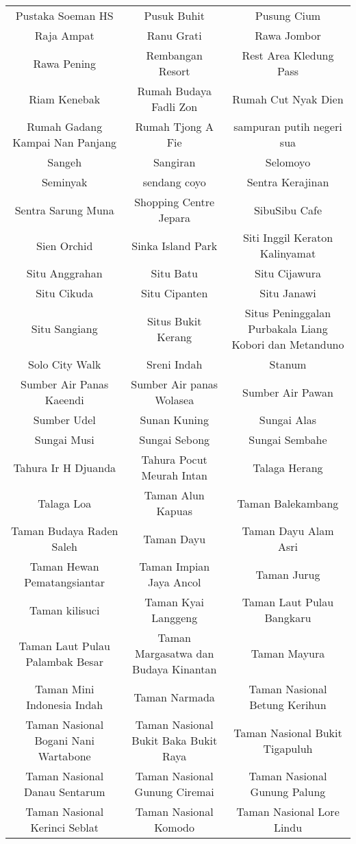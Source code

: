 \begin{table}[H]
\begin{tabular}{ c | c | c}
Pustaka Soeman HS & Pusuk Buhit & Pusung Cium\\
Raja Ampat & Ranu Grati & Rawa Jombor\\
Rawa Pening & Rembangan Resort & Rest Area Kledung Pass\\
Riam Kenebak & Rumah Budaya Fadli Zon & Rumah Cut Nyak Dien\\
Rumah Gadang Kampai Nan Panjang & Rumah Tjong A Fie & sampuran putih negeri sua\\
Sangeh & Sangiran & Selomoyo\\
Seminyak & sendang coyo & Sentra Kerajinan\\
Sentra Sarung Muna & Shopping Centre Jepara & SibuSibu Cafe\\
Sien Orchid & Sinka Island Park & Siti Inggil Keraton Kalinyamat\\
Situ Anggrahan & Situ Batu & Situ Cijawura\\
Situ Cikuda & Situ Cipanten & Situ Janawi\\
Situ Sangiang & Situs Bukit Kerang & Situs Peninggalan Purbakala Liang Kobori dan Metanduno\\
Solo City Walk & Sreni Indah & Stanum\\
Sumber Air Panas Kaeendi & Sumber Air panas Wolasea & Sumber Air Pawan\\
Sumber Udel & Sunan Kuning & Sungai Alas\\
Sungai Musi & Sungai Sebong & Sungai Sembahe\\
Tahura Ir H Djuanda & Tahura Pocut Meurah Intan & Talaga Herang\\
Talaga Loa & Taman Alun Kapuas & Taman Balekambang\\
Taman Budaya Raden Saleh & Taman Dayu & Taman Dayu Alam Asri\\
Taman Hewan Pematangsiantar & Taman Impian Jaya Ancol & Taman Jurug\\
Taman kilisuci & Taman Kyai Langgeng & Taman Laut Pulau Bangkaru\\
Taman Laut Pulau Palambak Besar & Taman Margasatwa dan Budaya Kinantan & Taman Mayura\\
Taman Mini Indonesia Indah & Taman Narmada & Taman Nasional Betung Kerihun\\
Taman Nasional Bogani Nani Wartabone & Taman Nasional Bukit Baka Bukit Raya & Taman Nasional Bukit Tigapuluh\\
Taman Nasional Danau Sentarum & Taman Nasional Gunung Ciremai & Taman Nasional Gunung Palung\\
Taman Nasional Kerinci Seblat & Taman Nasional Komodo & Taman Nasional Lore Lindu\\

\end{tabular}
\end{table}
